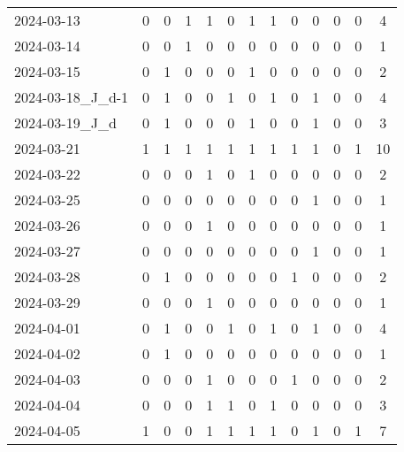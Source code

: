\documentclass[dvipdfmx,oneside]{article}
\begin{document}
\begin{longtable}{lcccccccccccc}
        2024-03-13 &     0 &     0 &     1 &     1 &     0 &     1 &     1 &     0 &     0 &     0 &     0 &      4 \\
        2024-03-14 &     0 &     0 &     1 &     0 &     0 &     0 &     0 &     0 &     0 &     0 &     0 &      1 \\
        2024-03-15 &     0 &     1 &     0 &     0 &     0 &     1 &     0 &     0 &     0 &     0 &     0 &      2 \\
2024-03-18\_J\_d-1 &     0 &     1 &     0 &     0 &     1 &     0 &     1 &     0 &     1 &     0 &     0 &      4 \\
  2024-03-19\_J\_d &     0 &     1 &     0 &     0 &     0 &     1 &     0 &     0 &     1 &     0 &     0 &      3 \\
        2024-03-21 &     1 &     1 &     1 &     1 &     1 &     1 &     1 &     1 &     1 &     0 &     1 &     10 \\
        2024-03-22 &     0 &     0 &     0 &     1 &     0 &     1 &     0 &     0 &     0 &     0 &     0 &      2 \\
        2024-03-25 &     0 &     0 &     0 &     0 &     0 &     0 &     0 &     0 &     1 &     0 &     0 &      1 \\
        2024-03-26 &     0 &     0 &     0 &     1 &     0 &     0 &     0 &     0 &     0 &     0 &     0 &      1 \\
        2024-03-27 &     0 &     0 &     0 &     0 &     0 &     0 &     0 &     0 &     1 &     0 &     0 &      1 \\
        2024-03-28 &     0 &     1 &     0 &     0 &     0 &     0 &     0 &     1 &     0 &     0 &     0 &      2 \\
        2024-03-29 &     0 &     0 &     0 &     1 &     0 &     0 &     0 &     0 &     0 &     0 &     0 &      1 \\
        2024-04-01 &     0 &     1 &     0 &     0 &     1 &     0 &     1 &     0 &     1 &     0 &     0 &      4 \\
        2024-04-02 &     0 &     1 &     0 &     0 &     0 &     0 &     0 &     0 &     0 &     0 &     0 &      1 \\
        2024-04-03 &     0 &     0 &     0 &     1 &     0 &     0 &     0 &     1 &     0 &     0 &     0 &      2 \\
        2024-04-04 &     0 &     0 &     0 &     1 &     1 &     0 &     1 &     0 &     0 &     0 &     0 &      3 \\
        2024-04-05 &     1 &     0 &     0 &     1 &     1 &     1 &     1 &     0 &     1 &     0 &     1 &      7 \\

\end{longtable}
\end{document}
